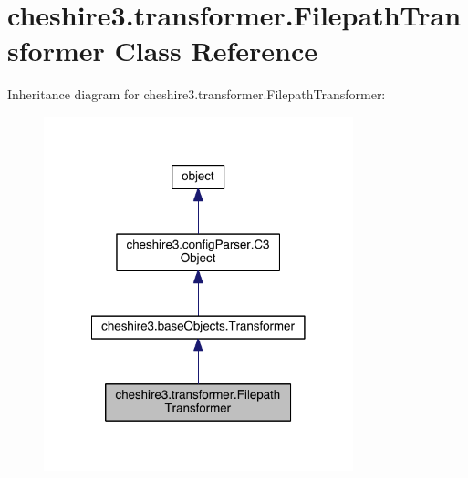 \hypertarget{classcheshire3_1_1transformer_1_1_filepath_transformer}{\section{cheshire3.\-transformer.\-Filepath\-Transformer Class Reference}
\label{classcheshire3_1_1transformer_1_1_filepath_transformer}
}


Inheritance diagram for cheshire3.\-transformer.\-Filepath\-Transformer\-:
\nopagebreak
\begin{figure}[H]
\begin{center}
\leavevmode
\includegraphics[width=254pt]{classcheshire3_1_1transformer_1_1_filepath_transformer__inherit__graph}
\end{center}
\end{figure}


